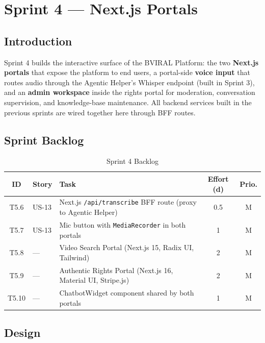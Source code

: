 \chapter{Sprint 4 — Next.js Portals}

\section*{Introduction}

Sprint 4 builds the interactive surface of the BVIRAL Platform: the two \textbf{Next.js portals}
that expose the platform to end users, a portal-side \textbf{voice input} that routes audio
through the Agentic Helper's Whisper endpoint (built in Sprint 3), and an \textbf{admin
workspace} inside the rights portal for moderation, conversation supervision, and knowledge-base
maintenance. All backend services built in the previous sprints are wired together here through
BFF routes.

\section{Sprint Backlog}

\begin{table}[H]
\centering
\caption{Sprint 4 Backlog}
\label{tab:sprint4_backlog}
\begin{tabularx}{\textwidth}{clXcc}
\toprule
\textbf{ID} & \textbf{Story} & \textbf{Task} & \textbf{Effort (d)} & \textbf{Prio.} \\
\midrule
T5.6 & US-13 & Next.js \texttt{/api/transcribe} BFF route (proxy to Agentic Helper) & 0.5 & M \\
T5.7 & US-13 & Mic button with \texttt{MediaRecorder} in both portals              & 1 & M \\
T5.8 & —     & Video Search Portal (Next.js 15, Radix UI, Tailwind)              & 2 & M \\
T5.9 & —     & Authentic Rights Portal (Next.js 16, Material UI, Stripe.js)       & 2 & M \\
T5.10 & —    & ChatbotWidget component shared by both portals                    & 1 & M \\
\bottomrule
\end{tabularx}
\end{table}

\section{Design}

